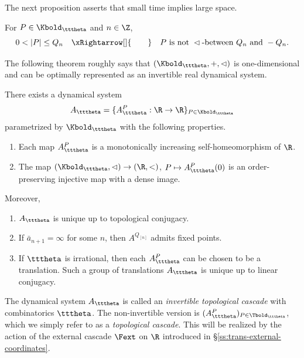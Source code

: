 \documentclass{amsart}
\begin{document}
The next proposition asserts that small time implies large space.

\begin{proposition}
\label{prop:proper-discontinuity}
    For $P \in \Kbold_{\tttheta}$ and $n \in \Z$, 
    \[
        0 < |P| \leq Q_n 
        \quad \xRightarrow[]{\qquad} \quad
        P \textnormal{ is not } \lhd\textnormal{-between } Q_n \textnormal{ and } -Q_n.
    \]
\end{proposition}

The following theorem roughly says that $(\Kbold_{\tttheta},+,\lhd)$ is one-dimensional and can be optimally represented as an invertible real dynamical system.

\begin{theorem}
\label{thm:topological-cascade}
    There exists a dynamical system
    \[
        A_{\tttheta} = \{ A_{\tttheta}^P : \R \to \R \}_{P \in \Kbold_{\tttheta}}
    \]
    parametrized by $\Kbold_{\tttheta}$ with the following properties.
    \begin{enumerate}
        \item Each map $A_{\tttheta}^P$ is a monotonically increasing self-homeomorphism of $\R$.
        \item The map $(\Kbold_{\tttheta}, \lhd) \to (\R,<)$, $P \mapsto A_{\tttheta}^P(0)$ is an order-preserving injective map with a dense image.
    \end{enumerate}
    Moreover,
    \begin{enumerate}[start=3]
        \item $A_{\tttheta}$ is unique up to topological conjugacy.
        \item If $\bar{a}_{n+1} = \infty$ for some $n$, then $A^{Q_{[n]}}$ admits fixed points.
        \item If $\tttheta$ is irrational, then each $A_{\tttheta}^P$ can be chosen to be a translation.
        Such a group of translations $A_{\tttheta}$ is unique up to linear conjugacy. 
    \end{enumerate}
\end{theorem}

The dynamical system $A_{\tttheta}$ is called an \emph{invertible topological cascade} with combinatorics $\tttheta$.
The non-invertible version is $(A_{\tttheta}^P)_{P \in \Tbold_{\tttheta}}$, which we simply refer to as a \emph{topological cascade}.
This will be realized by the action of the external cascade $\Fext$ on $\R$ introduced in \S\ref{ss:trans-external-coordinates}.
\end{document}
